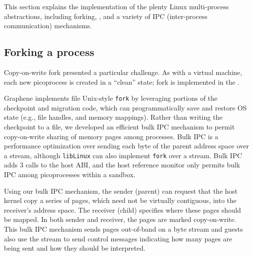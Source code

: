 This section explains the \thelibos{} implementation of
the plenty Linux multi-process abstractions,
including forking, , and a variety of IPC (inter-process communication) mechanisms. 




\subsection{Forking a process}


Copy-on-write fork presented a particular challenge.
As with a virtual machine, each new picoprocess 
is created in a ``clean'' state; fork is implemented in the \libos{}.

Graphene implements file Unix-style {\tt fork}
by leveraging portions of the checkpoint and migration code,
which can programmatically save and restore OS state (e.g., file handles, and memory mappings).
Rather than writing the checkpoint to a file, 
we developed an efficient bulk IPC mechanism to 
permit copy-on-write sharing of memory pages among processes.
Bulk IPC is a performance optimization over sending each byte of the parent address
space over a stream, although {\tt libLinux} can also implement {\tt fork}
over a stream.
Bulk IPC adds 3 calls to the host ABI,
and the host reference monitor only permits bulk IPC among
picoprocesses within a sandbox.



Using our bulk IPC mechanism,
the sender (parent) can request that the host kernel copy
a series of pages, which need not be virtually contiguous,
into the receiver's address space.
The receiver (child) specifies where these pages should be mapped.
In both sender and receiver, the pages are marked copy-on-write.  
This bulk IPC mechanism sends pages out-of-band on a byte stream and guests also use the stream to send control messages 
indicating 
how many pages are being sent and how they should be interpreted.

